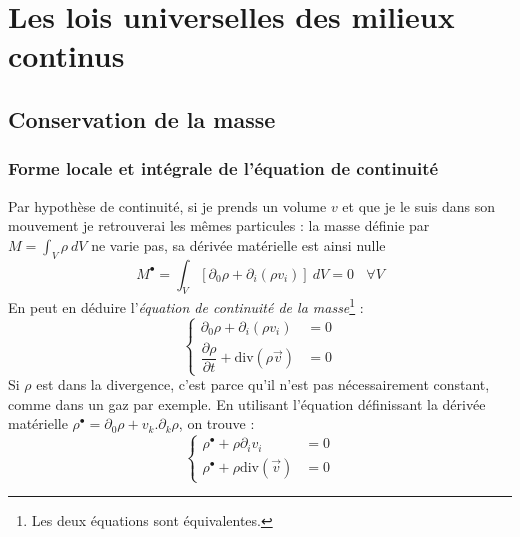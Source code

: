 \chapter{Les lois universelles des milieux continus}
\section{Conservation de la masse}
\subsection{Forme locale et intégrale de l'équation de continuité}
Par hypothèse de continuité, si je prends un volume $v$ et que je le suis dans son
mouvement je retrouverai les mêmes particules : la masse définie par $M = \int_V \rho\ 
dV$ ne varie pas, sa dérivée matérielle est ainsi nulle 
\begin{equation}
	M^\bullet = \int_V [\partial_0\rho + \partial_i(\rho v_i)]\ dV = 0\ \ \ \ \forall V
\end{equation}
En peut en déduire l'\textit{équation de continuité de la masse}\footnote{Les deux
équations sont équivalentes.} :
\begin{equation}
	\left\{\begin{array}{ll}
	\partial_0\rho + \partial_i(\rho v_i) &=0  \\
	\dfrac{\partial\rho}{\partial t} + \text{div}(\rho \vec v) &= 0 
	\end{array}\right.
\end{equation}
Si $\rho$ est dans la divergence, c'est parce qu'il n'est pas nécessairement constant, 
comme dans un gaz par exemple. En utilisant l'équation définissant la dérivée matérielle
$\rho^\bullet = \partial_0\rho+ v_k.\partial_k\rho$, on trouve :
\begin{equation}
	\left\{\begin{array}{ll}
	\rho^\bullet +\rho\partial_i v_i &= 0   \\
	\rho^\bullet +\rho\text{div}(\vec v) &=0 
	\end{array}\right.
\end{equation}

